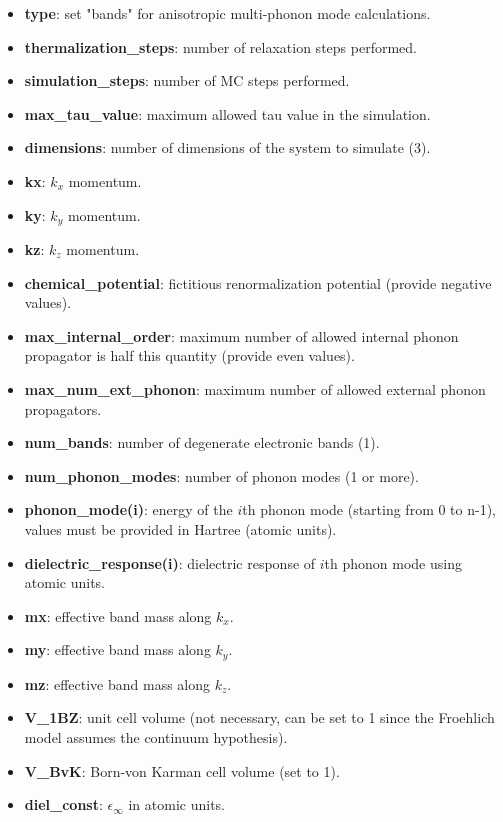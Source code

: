 \begin{itemize}
    \item \textbf{type}: set "bands" for anisotropic multi-phonon mode calculations.
    \item \textbf{thermalization\_steps}: number of relaxation steps performed.
    \item \textbf{simulation\_steps}: number of MC steps performed.       
    \item \textbf{max\_tau\_value}: maximum allowed tau value in the simulation.
    \item \textbf{dimensions}: number of dimensions of the system to simulate (3).
    \item \textbf{kx}: $k_x$ momentum.
    \item \textbf{ky}: $k_y$ momentum.
    \item \textbf{kz}: $k_z$ momentum.
    \item \textbf{chemical\_potential}: fictitious renormalization potential (provide negative values).
    \item \textbf{max\_internal\_order}: maximum number of allowed internal phonon propagator is half this quantity (provide even values).
    \item \textbf{max\_num\_ext\_phonon}: maximum number of allowed external phonon propagators.
    \item \textbf{num\_bands}: number of degenerate electronic bands (1).
    \item \textbf{num\_phonon\_modes}: number of phonon modes (1 or more).
    \item \textbf{phonon\_mode(i)}: energy of the $i$th phonon mode (starting from 0 to n-1), values must be provided in Hartree (atomic units).
    \item \textbf{dielectric\_response(i)}: dielectric response of $i$th phonon mode using atomic units.
    \item \textbf{mx}: effective band mass along $k_x$.
    \item \textbf{my}: effective band mass along $k_y$.
    \item \textbf{mz}: effective band mass along $k_z$.
    \item \textbf{V\_1BZ}: unit cell volume (not necessary, can be set to 1 since the Froehlich model assumes the continuum hypothesis).
    \item \textbf{V\_BvK}: Born-von Karman cell volume (set to 1).
    \item \textbf{diel\_const}: $\epsilon_\infty$ in atomic units.
\end{itemize}
